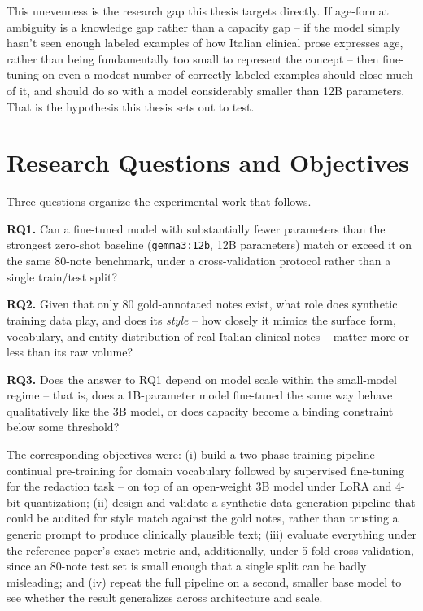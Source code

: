 \documentclass[12pt,a4paper]{report}
\begin{document}
This unevenness is the research gap this thesis targets directly. If age-format ambiguity is a knowledge gap rather than a capacity gap -- if the model simply hasn't seen enough labeled examples of how Italian clinical prose expresses age, rather than being fundamentally too small to represent the concept -- then fine-tuning on even a modest number of correctly labeled examples should close much of it, and should do so with a model considerably smaller than 12B parameters. That is the hypothesis this thesis sets out to test.

\section{Research Questions and Objectives}

Three questions organize the experimental work that follows.

\textbf{RQ1.} Can a fine-tuned model with substantially fewer parameters than the strongest zero-shot baseline (\texttt{gemma3:12b}, 12B parameters) match or exceed it on the same 80-note benchmark, under a cross-validation protocol rather than a single train/test split?

\textbf{RQ2.} Given that only 80 gold-annotated notes exist, what role does synthetic training data play, and does its \emph{style} -- how closely it mimics the surface form, vocabulary, and entity distribution of real Italian clinical notes -- matter more or less than its raw volume?

\textbf{RQ3.} Does the answer to RQ1 depend on model scale within the small-model regime -- that is, does a 1B-parameter model fine-tuned the same way behave qualitatively like the 3B model, or does capacity become a binding constraint below some threshold?

The corresponding objectives were: (i) build a two-phase training pipeline -- continual pre-training for domain vocabulary followed by supervised fine-tuning for the redaction task -- on top of an open-weight 3B model under LoRA and 4-bit quantization; (ii) design and validate a synthetic data generation pipeline that could be audited for style match against the gold notes, rather than trusting a generic prompt to produce clinically plausible text; (iii) evaluate everything under the reference paper's exact metric and, additionally, under 5-fold cross-validation, since an 80-note test set is small enough that a single split can be badly misleading; and (iv) repeat the full pipeline on a second, smaller base model to see whether the result generalizes across architecture and scale.
\end{document}
